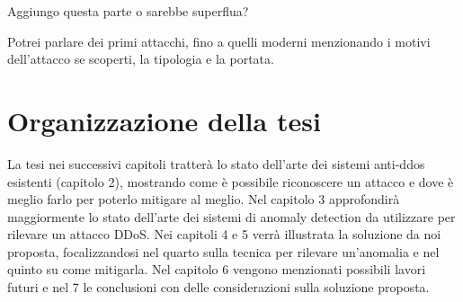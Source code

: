 
Aggiungo questa parte o sarebbe superflua?

Potrei parlare dei primi attacchi, fino a quelli moderni menzionando i motivi dell'attacco se scoperti, la tipologia e la portata.


\section{Organizzazione della tesi}

La tesi nei successivi capitoli tratterà lo stato dell'arte dei sistemi anti-ddos esistenti (capitolo 2), mostrando come è possibile riconoscere un attacco e dove è meglio farlo per poterlo mitigare al meglio. Nel capitolo 3 approfondirà maggiormente lo stato dell'arte dei sistemi di anomaly detection da utilizzare per rilevare un attacco DDoS.
Nei capitoli 4 e 5 verrà illustrata la soluzione da noi proposta, focalizzandosi nel quarto sulla tecnica per rilevare un'anomalia e nel quinto su come mitigarla.
Nel capitolo 6 vengono menzionati possibili lavori futuri e nel 7 le conclusioni con delle considerazioni sulla soluzione proposta.